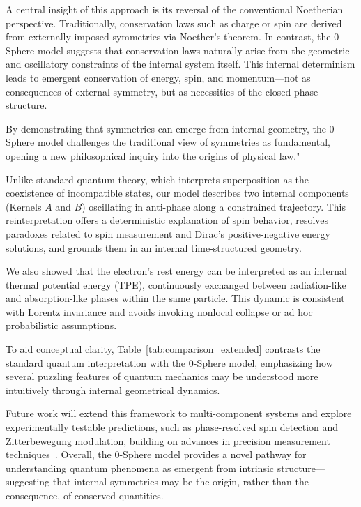 \documentclass[%
 reprint,
 amsmath,amssymb,
 aps,
]{revtex4-1}
\numberwithin{equation}{section}%
\begin{document}
A central insight of this approach is its reversal of the conventional Noetherian perspective. Traditionally, conservation laws such as charge or spin are derived from externally imposed symmetries via Noether’s theorem. In contrast, the 0-Sphere model suggests that conservation laws naturally arise from the geometric and oscillatory constraints of the internal system itself. This internal determinism leads to emergent conservation of energy, spin, and momentum—not as consequences of external symmetry, but as necessities of the closed phase structure.

By demonstrating that symmetries can emerge from internal geometry, the 0-Sphere model challenges the traditional view of symmetries as fundamental, opening a new philosophical inquiry into the origins of physical law."

Unlike standard quantum theory, which interprets superposition as the coexistence of incompatible states, our model describes two internal components (Kernels $A$ and $B$) oscillating in anti-phase along a constrained trajectory. This reinterpretation offers a deterministic explanation of spin behavior, resolves paradoxes related to spin measurement and Dirac’s positive-negative energy solutions, and grounds them in an internal time-structured geometry.

We also showed that the electron’s rest energy can be interpreted as an internal thermal potential energy (TPE), continuously exchanged between radiation-like and absorption-like phases within the same particle. This dynamic is consistent with Lorentz invariance and avoids invoking nonlocal collapse or ad hoc probabilistic assumptions.

To aid conceptual clarity, Table~\ref{tab:comparison_extended} contrasts the standard quantum interpretation with the 0-Sphere model, emphasizing how several puzzling features of quantum mechanics may be understood more intuitively through internal geometrical dynamics.

Future work will extend this framework to multi-component systems and explore experimentally testable predictions, such as phase-resolved spin detection and Zitterbewegung modulation, building on advances in precision measurement techniques~\cite{gabrielse2013, fan2023}. Overall, the 0-Sphere model provides a novel pathway for understanding quantum phenomena as emergent from intrinsic structure—suggesting that internal symmetries may be the origin, rather than the consequence, of conserved quantities.
\end{document}
